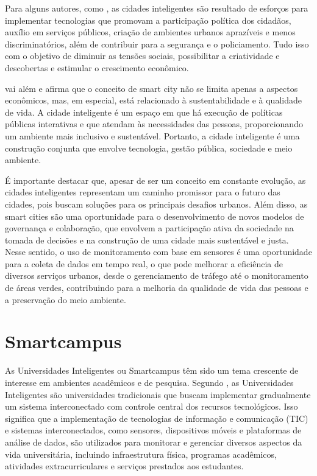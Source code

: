 \documentclass[tcc,capa]{texufpel}
\begin{document}
Para alguns autores, como \citet{moro19}, as cidades inteligentes são resultado de esforços para implementar tecnologias que promovam a participação política dos cidadãos, auxílio em serviços públicos, criação de ambientes urbanos aprazíveis e menos discriminatórios, além de contribuir para a segurança e o policiamento. Tudo isso com o objetivo de diminuir as tensões sociais, possibilitar a criatividade e descobertas e estimular o crescimento econômico.

\citet{pozzeti2022cidade} vai além e afirma que o conceito de smart city não se limita apenas a aspectos econômicos, mas, em especial, está relacionado à sustentabilidade e à qualidade de vida. A cidade inteligente é um espaço em que há execução de políticas públicas interativas e que atendam às necessidades das pessoas, proporcionando um ambiente mais inclusivo e sustentável. Portanto, a cidade inteligente é uma construção conjunta que envolve tecnologia, gestão pública, sociedade e meio ambiente.

É importante destacar que, apesar de ser um conceito em constante evolução, as cidades inteligentes representam um caminho promissor para o futuro das cidades, pois buscam soluções para os principais desafios urbanos. Além disso, as smart cities são uma oportunidade para o desenvolvimento de novos modelos de governança e colaboração, que envolvem a participação ativa da sociedade na tomada de decisões e na construção de uma cidade mais sustentável e justa. Nesse sentido, o uso de monitoramento com base em sensores é uma oportunidade para a coleta de dados em tempo real, o que pode melhorar a eficiência de diversos serviços urbanos, desde o gerenciamento de tráfego até o monitoramento de áreas verdes, contribuindo para a melhoria da qualidade de vida das pessoas e a preservação do meio ambiente.

\section{Smartcampus}
As Universidades Inteligentes ou Smartcampus têm sido um tema crescente de interesse em ambientes acadêmicos e de pesquisa. Segundo \citet{schiopoiu2017development}, as Universidades Inteligentes são universidades tradicionais que buscam implementar gradualmente um sistema interconectado com controle central dos recursos tecnológicos. Isso significa que a implementação de tecnologias de informação e comunicação (TIC) e sistemas interconectados, como sensores, dispositivos móveis e plataformas de análise de dados, são utilizados para monitorar e gerenciar diversos aspectos da vida universitária, incluindo infraestrutura física, programas acadêmicos, atividades extracurriculares e serviços prestados aos estudantes.
\end{document}
